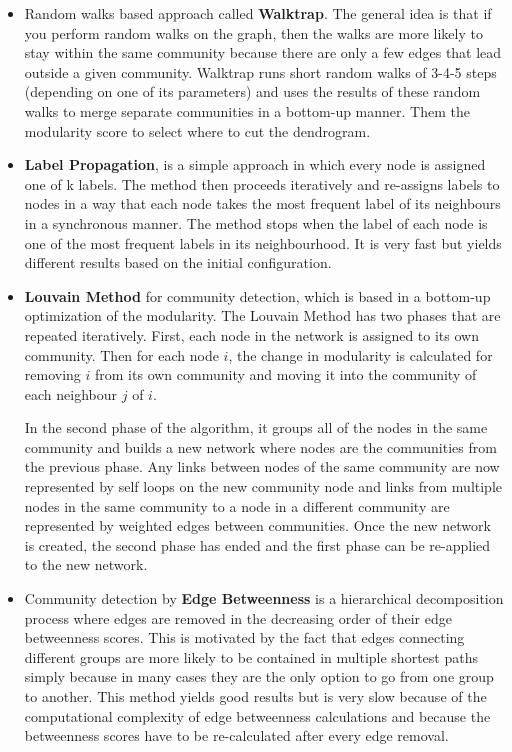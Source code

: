 \documentclass[12pt,a4paper,oneside]{article}
\numberwithin{equation}{section}
\numberwithin{equation}{section}
\theoremstyle{definition}
\begin{document}
\begin{itemize}
	\item Random walks based approach called \textbf{Walktrap}. The general idea is that if you perform random walks on the graph, then the walks are more likely to stay within the same community because there are only a few edges that lead outside a given community. Walktrap runs short random walks of 3-4-5 steps (depending on one of its parameters) and uses the results of these random walks to merge separate communities in a bottom-up manner. Them  the modularity score to select where to cut the dendrogram.
	
	\item \textbf{Label Propagation}, is a simple approach in which every node is assigned one of k labels. The method then proceeds iteratively and re-assigns labels to nodes in a way that each node takes the most frequent label of its neighbours in a synchronous manner. The method stops when the label of each node is one of the most frequent labels in its neighbourhood. It is very fast but yields different results based on the initial configuration.
	
	\item \textbf{Louvain Method} for community detection, which is based in a bottom-up  optimization of the modularity. The Louvain Method has two phases that are repeated iteratively.
	First, each node in the network is assigned to its own community. Then for each node $ i $, the change in modularity is calculated for removing $ i $ from its own community and moving it into the community of each neighbour $ j $ of  $ i $.
	
	In the second phase of the algorithm, it groups all of the nodes in the same community and builds a new network where nodes are the communities from the previous phase. Any links between nodes of the same community are now represented by self loops on the new community node and links from multiple nodes in the same community to a node in a different community are represented by weighted edges between communities. Once the new network is created, the second phase has ended and the first phase can be re-applied to the new network.
	
	\item Community detection by \textbf{Edge Betweenness} is a hierarchical decomposition process where edges are removed in the decreasing order of their edge betweenness scores. This is motivated by the fact that edges connecting different groups are more likely to be contained in multiple shortest paths simply because in many cases they are the only option to go from one group to another. This method yields good results but is very slow because of the computational complexity of edge betweenness calculations and because the betweenness scores have to be re-calculated after every edge removal.
	
\end{itemize}
\end{document}
